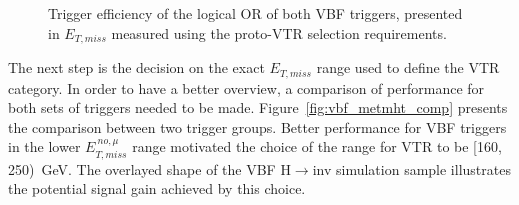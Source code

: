 \begin{figure}[htbp]
  \centering
  \caption{Trigger efficiency of the logical OR of both VBF triggers, presented in $E_{T,miss}$ measured using the proto-VTR selection requirements.}
  \label{fig:vbf_proto_trig_eff}
\end{figure}

\hspace{10pt} The next step is the decision on the exact $E_{T,miss}$ range used to define the VTR category. In order to have a better overview, a comparison of performance for both sets of triggers needed to be made. Figure~\ref{fig:vbf_metmht_comp} presents the comparison between two trigger groups. Better performance for VBF triggers in the lower $E_{T,miss}^{~no, \mu}$ range motivated the choice of the range for VTR to be [160, 250)~GeV. The overlayed shape of the VBF H$\rightarrow$inv simulation sample illustrates the potential signal gain achieved by this choice.

